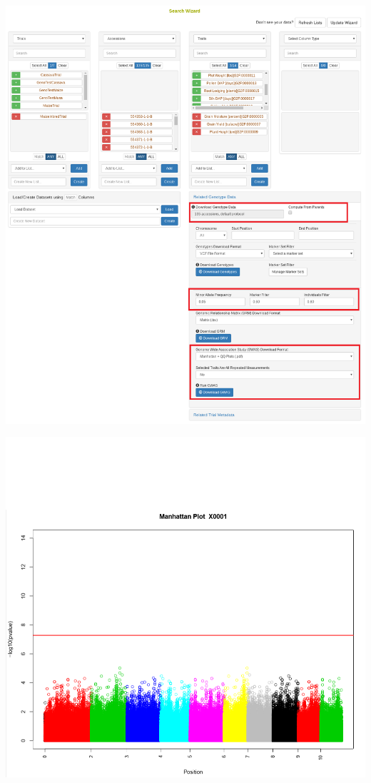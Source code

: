 \documentclass[
  12pt,
]{book}
\begin{document}
\begin{center}\includegraphics[width=0.95\linewidth]{assets/images/search_wizard_genotype_analyses_gwas} \end{center}

\begin{center}\includegraphics[width=0.95\linewidth]{assets/images/search_wizard_genotype_analyses_manhattan_plot} \end{center}
\end{document}
